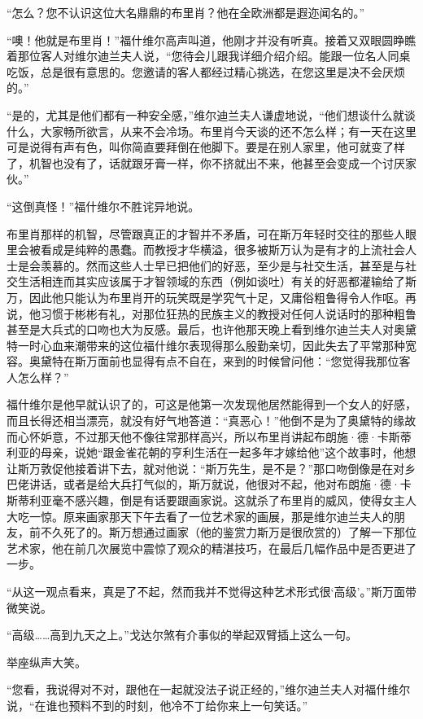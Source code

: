 \par “怎么？您不认识这位大名鼎鼎的布里肖？他在全欧洲都是遐迩闻名的。”
\par “噢！他就是布里肖！”福什维尔高声叫道，他刚才并没有听真。接着又双眼圆睁瞧着那位客人对维尔迪兰夫人说，“您待会儿跟我详细介绍介绍。能跟一位名人同桌吃饭，总是很有意思的。您邀请的客人都经过精心挑选，在您这里是决不会厌烦的。”
\par “是的，尤其是他们都有一种安全感，”维尔迪兰夫人谦虚地说，“他们想谈什么就谈什么，大家畅所欲言，从来不会冷场。布里肖今天谈的还不怎么样；有一天在这里可是说得有声有色，叫你简直要拜倒在他脚下。要是在别人家里，他可就变了样了，机智也没有了，话就跟牙膏一样，你不挤就出不来，他甚至会变成一个讨厌家伙。”
\par “这倒真怪！”福什维尔不胜诧异地说。
\par 布里肖那样的机智，尽管跟真正的才智并不矛盾，可在斯万年轻时交往的那些人眼里会被看成是纯粹的愚蠢。而教授才华横溢，很多被斯万认为是有才的上流社会人士是会羡慕的。然而这些人士早已把他们的好恶，至少是与社交生活，甚至是与社交生活相连而其实应该属于才智领域的东西（例如谈吐）有关的好恶都灌输给了斯万，因此他只能认为布里肖开的玩笑既是学究气十足，又庸俗粗鲁得令人作呕。再说，他习惯于彬彬有礼，对那位狂热的民族主义的教授对任何人说话时的那种粗鲁甚至是大兵式的口吻也大为反感。最后，也许他那天晚上看到维尔迪兰夫人对奥黛特一时心血来潮带来的这位福什维尔表现得那么殷勤亲切，因此失去了平常那种宽容。奥黛特在斯万面前也显得有点不自在，来到的时候曾问他：“您觉得我那位客人怎么样？”
\par 福什维尔是他早就认识了的，可这是他第一次发现他居然能得到一个女人的好感，而且长得还相当漂亮，就没有好气地答道：“真恶心！”他倒不是为了奥黛特的缘故而心怀妒意，不过那天他不像往常那样高兴，所以布里肖讲起布朗施·德·卡斯蒂利亚的母亲，说她“跟金雀花朝的亨利生活在一起多年才嫁给他”这个故事时，他想让斯万敦促他接着讲下去，就对他说：“斯万先生，是不是？”那口吻倒像是在对乡巴佬讲话，或者是给大兵打气似的，斯万就说，他很对不起，他对布朗施·德·卡斯蒂利亚毫不感兴趣，倒是有话要跟画家说。这就杀了布里肖的威风，使得女主人大吃一惊。原来画家那天下午去看了一位艺术家的画展，那是维尔迪兰夫人的朋友，前不久死了的。斯万想通过画家（他的鉴赏力斯万是很欣赏的）了解一下那位艺术家，他在前几次展览中震惊了观众的精湛技巧，在最后几幅作品中是否更进了一步。
\par “从这一观点看来，真是了不起，然而我并不觉得这种艺术形式很‘高级’。”斯万面带微笑说。
\par “高级……高到九天之上。”戈达尔煞有介事似的举起双臂插上这么一句。
\par 举座纵声大笑。
\par “您看，我说得对不对，跟他在一起就没法子说正经的，”维尔迪兰夫人对福什维尔说，“在谁也预料不到的时刻，他冷不丁给你来上一句笑话。”
